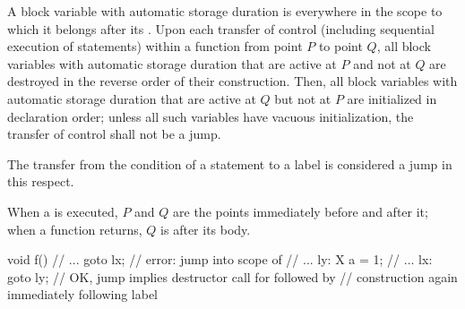 \pnum
{}%
%
%
A block variable with automatic storage duration
is  everywhere in the scope to which it belongs
after its .
%
%
Upon each transfer of control (including sequential execution of statements)
within a function from point $P$ to point $Q$,
all block variables with automatic storage duration
that are active at $P$ and not at $Q$ are destroyed in the reverse order of their construction.
Then, all block variables with automatic storage duration
that are active at $Q$ but not at $P$ are initialized in declaration order;
unless all such variables have vacuous initialization,
the transfer of control shall not be a jump.
\begin{footnote}
The transfer from the condition of a  statement to a
 label is considered a jump in this respect.
\end{footnote}
When a  is executed,
$P$ and $Q$ are the points immediately before and after it;
when a function returns, $Q$ is after its body.
\begin{example}
\begin{codeblock}
void f() {
  // ...
  goto lx;          // error: jump into scope of 
  // ...
ly:
  X a = 1;
  // ...
lx:
  goto ly;          // OK, jump implies destructor call for  followed by
                    // construction again immediately following label 
}
\end{codeblock}
\end{example}

